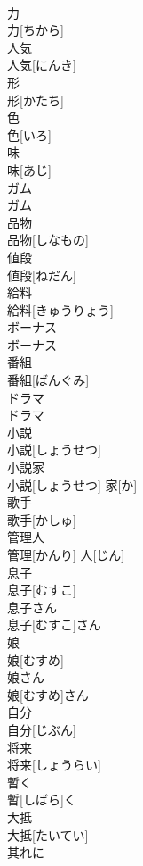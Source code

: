 \documentclass[8pt]{extreport}
\begin{document}
\begin{CJK}{UTF8}{min}
\\	力	
\\	力[ちから]	
\\	人気	
\\	人気[にんき]	
\\	形	
\\	形[かたち]	
\\	色	
\\	色[いろ]	
\\	味	
\\	味[あじ]	
\\	ガム	
\\	ガム	
\\	品物	
\\	品物[しなもの]	
\\	値段	
\\	値段[ねだん]	
\\	給料	
\\	給料[きゅうりょう]	
\\	ボーナス	
\\	ボーナス	
\\	番組	
\\	番組[ばんぐみ]	
\\	ドラマ	
\\	ドラマ	
\\	小説	
\\	小説[しょうせつ]	
\\	小説家	
\\	小説[しょうせつ] 家[か]	
\\	歌手	
\\	歌手[かしゅ]	
\\	管理人	
\\	管理[かんり] 人[じん]	
\\	息子	
\\	息子[むすこ]	
\\	息子さん	
\\	息子[むすこ]さん	
\\	娘	
\\	娘[むすめ]	
\\	娘さん	
\\	娘[むすめ]さん	
\\	自分	
\\	自分[じぶん]	
\\	将来	
\\	将来[しょうらい]	
\\	暫く	
\\	暫[しばら]く	
\\	大抵	
\\	大抵[たいてい]	
\\	其れに	

\end{CJK}
\end{document}
